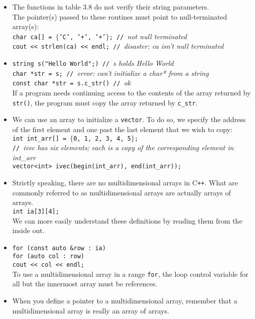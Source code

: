 \begin{itemize}
\item
The functions in table 3.8 do not verify their string parameters.\\
The pointer(s) passed to these routines must point to null-terminated array(s):\\
\hspace*{1em}\texttt{char ca[] = $\{$'C', '+', '+'$\}$; // }\textit{not null terminated}\\
\hspace*{1em}\texttt{cout << strlen(ca) << endl; // }\textit{disaster: ca isn't null terminated}

\item
\hspace*{1em}\texttt{string s("Hello World";) // }\textit{s holds Hello World}\\
\hspace*{1em}\texttt{char *str = s; // }\textit{error: can't initialize a char* from a string}\\
\hspace*{1em}\texttt{const char *str = s.c\_str() // }\textit{ok}\\
If a program needs continuing access to the contents of the array returned by \texttt{str()}, the program must copy the array returned by \texttt{c\_str}.

\item
We can use an array to initialize a \texttt{vector}. To do so, we specify the address of the first element and one past the last element that we wish to copy:\\
\hspace*{1em}\texttt{int int\_arr[] = $\{$0, 1, 2, 3, 4, 5$\}$;}\\
\hspace*{1em}\texttt{// }\textit{ivec has six elements; each is a copy of the corresponding element in int\_arr}\\
\hspace*{1em}\texttt{vector<int> ivec(begin(int\_arr), end(int\_arr));}

\item
Strictly speaking, there are no multidimensional arrays in C\texttt{++}. What are commonly referred to as multidimensional arrays are actually arrays of arrays.\\
\hspace*{1em}\texttt{int ia[3][4];}\\
We can more easily understand these definitions by reading them from the inside out.

\item
\hspace*{1em}\texttt{for (const auto \&row : ia)}\\
\hspace*{3em}\texttt{for (auto col : row)}\\
\hspace*{5em}\texttt{cout << col << endl;}\\
To use a multidimensional array in a range \texttt{for}, the loop control variable for all but the innermost array must be references.

\item
When you define a pointer to a multidimensional array, remember that a multidimensional array is really an array of arrays.

\end{itemize}